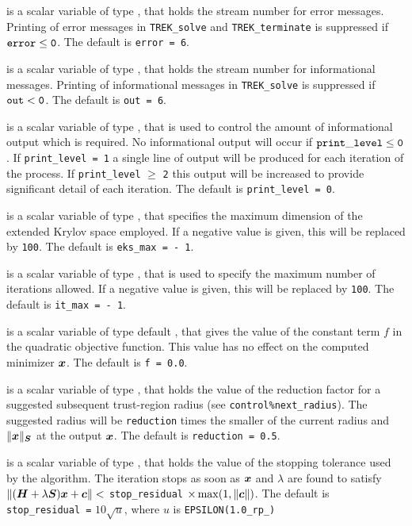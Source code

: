 \documentclass{galahad}
\newcommand{\packagename}{TREK}
\begin{document}
\begin{description}
 is a scalar variable of type \integer, that holds the
stream number for error messages.
Printing of error messages in
{\tt \packagename\_solve} and {\tt \packagename\_terminate}
is suppressed if ${\tt error} \leq {\tt 0}$.
The default is {\tt error = 6}.

 is a scalar variable of type \integer, that holds the
stream number for informational messages.
Printing of informational messages in
{\tt \packagename\_solve} is suppressed if ${\tt out} < {\tt 0}$.
The default is {\tt out = 6}.

 is a scalar variable of type \integer,
that is used
to control the amount of informational output which is required. No
informational output will occur if ${\tt print\_level} \leq {\tt 0}$. If
{\tt print\_level = 1} a single line of output will be produced for each
iteration of the process. If {\tt print\_level} $\geq$ {\tt 2} this output
will be increased to provide significant detail of each iteration.
The default is {\tt print\_level = 0}.

 is a scalar variable of type \integer, that specifies
the maximum dimension of the extended Krylov space employed. 
If a negative value is given, this will be replaced by {\tt 100}.
The default is {\tt eks\_max = - 1}.

 is a scalar variable of type \integer, that is used
to specify the maximum number of iterations allowed.
If a negative value is given, this will be replaced by {\tt 100}.
The default is {\tt it\_max = - 1}.

 is a scalar variable of type default
\realdp, that gives the value of the constant term $f$ in the
quadratic objective function. This value has no effect on the
computed minimizer ${\bm{x}}$. The default is {\tt f = 0.0}.

 is a scalar variable of type \realdp, that holds the value
of the reduction factor for a suggested subsequent trust-region radius
(see {\tt control\%next\_radius}).
The suggested radius will be {\tt reduction} times the smaller of
the current radius and $\|{\bm{x}}\|_{{\bm{S}}}$ at the output ${\bm{x}}$.
The default is {\tt reduction = 0.5}.

 is a scalar variable of type \realdp, that holds
the value of the stopping tolerance used by the algorithm. The
iteration stops as soon as ${\bm{x}}$ and $\lambda$ are found to satisfy
$\| ( {\bm{H}} + \lambda {\bm{S}} ) {\bm{x}} + {\bm{c}} \| <$ {\tt stop\_residual} 
$\times \max( 1, \|{\bm{c}}\| )$.
The default is {\tt stop\_residual =} $10\sqrt{u}$,
where $u$ is {\tt EPSILON(1.0\_rp\_)}


\end{description}
\end{document}
